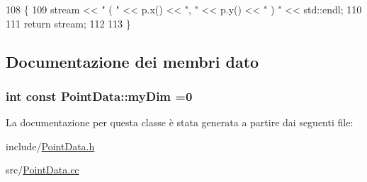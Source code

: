 \begin{DoxyCode}
108 \{
109     stream << \textcolor{stringliteral}{" ( "} << p.x() << \textcolor{stringliteral}{", "} << p.y() << \textcolor{stringliteral}{" ) "} << std::endl;
110     
111     \textcolor{keywordflow}{return} stream;
112     
113 \}\end{DoxyCode}


\subsection{Documentazione dei membri dato}
\hypertarget{classPointData_a71cd9807bc1c94983debb8bbe034916f}{
\subsubsection[{my\-Dim}]{\setlength{\rightskip}{0pt plus 5cm}int const Point\-Data\-::my\-Dim =0\hspace{0.3cm}{\ttfamily [static]}}}\label{classPointData_a71cd9807bc1c94983debb8bbe034916f}


La documentazione per questa classe è stata generata a partire dai seguenti file\-:\begin{DoxyCompactItemize}
\item 
include/\hyperlink{PointData_8h}{Point\-Data.\-h}\item 
src/\hyperlink{PointData_8cc}{Point\-Data.\-cc}\end{DoxyCompactItemize}
